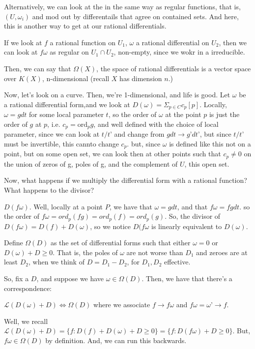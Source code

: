 \documentclass[10pt]{article}
\begin{document}
Alternatively, we can look at the in the same way as regular functions, that is, $(U, \omega_i)$ and mod out by differentails that agree on contained sets. And here, this is another way to get at our rational differentials.

If we look at $f$ a rational function on $U_1$, $\omega$ a rational differential on $U_2$, then we can look at $f \omega$ as regular on $U_1 \cap U_2$, non-empty, since we wokr in a irreducible. 

Then, we can say that $\Omega(X)$, the space of rational differentials is a vector space over $K(X)$, n-dimensional (recall $X$ has dimension $n$.) 

Now, let’s look on a curve. Then, we’re 1-dimensional, and life is good. Let $\omega$ be a rational differential form,and we look at $D(\omega) = \Sigma_{p \in C} c_p [p]$. Locally, $\omega = g dt$ for some local parameter $t$, so the order of $\omega$ at the point $p$ is just the order of $g$ at $p$, i.e. $c_p = \text{ord}_p g$, and well defined with the choice of local parameter, since we can look at $t/t’$ and change from $gdt \to g’ dt’$, but since $t/t’$ must be invertible, this cannto change $c_p$. but, since $\omega$ is defined like this not on a point, but on some open set, we can look then at other points such that $c_p \not = 0$ on the union of zeros of g, poles of g, and the complement of $U$, this open set.

Now, what happens if we multiply the differential form with a rational function? What happens to the divisor?

$D(f\omega)$. Well, locally at a point $P$, we have that $\omega = gdt$, and that $f\omega = fg dt$. so the order of $f\omega = ord_p(fg) = ord_p (f) = ord_p(g)$. So, the divisor of $D(f\omega) = D(f) + D(\omega)$, so we notice $D(f\omega$ is linearly equivalent to $D(\omega)$.

Define $\Omega(D)$ as the set of differential forms such that either $\omega = 0$ or $D(\omega) + D \geq 0$. That is, the poles of $\omega $ are not worse than $D_1$ and zeroes are at least $D_2$, when we think of $D = D_1 - D_2$, for $D_1,D_2$ effective.

So, fix a $D$, and suppose we have $\omega \in \Omega(D)$. Then, we have that there’s a correspondence:

$\mathcal{L}(D(\omega) + D) \iff \Omega(D)$ where we associate  $f \to f\omega$ and $f\omega = \omega’  \to f$.

Well, we recall $\mathcal{L}(D(\omega) + D) = \{ f : D(f) + D(\omega) + D \geq 0 \} = \{ f : D(f\omega) + D \geq 0 \}$. But, $f \omega \in \Omega(D)$ by definition. And, we can run this backwards.
\end{document}
